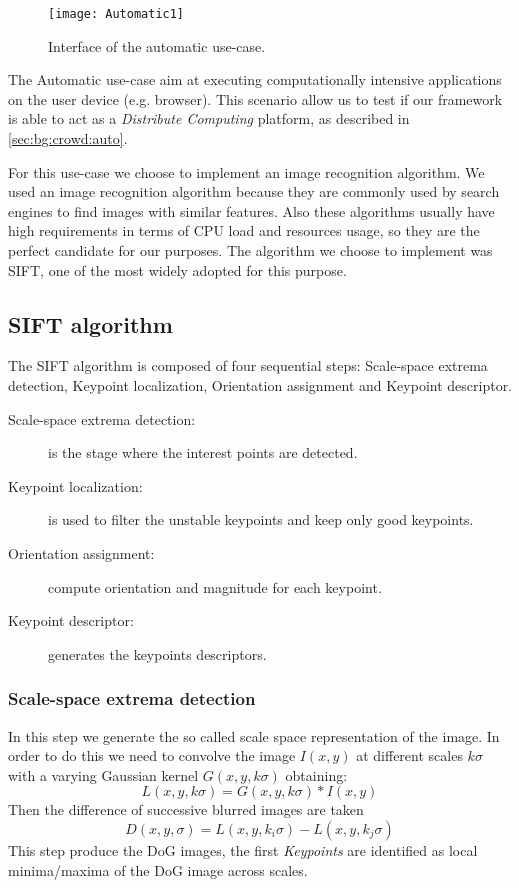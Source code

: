 \begin{figure}[htb]
    \centering
    \texttt{[image: Automatic1]}
    \caption{Interface of the automatic use-case.}
    \label{fig:Automatic1}
\end{figure}

The Automatic use-case aim at executing computationally intensive applications
on the user device (e.g. browser). This scenario allow us to test if our
framework is able to act as a \emph{Distribute Computing} platform, as described
in \ref{sec:bg:crowd:auto}.


For this use-case we choose to implement an image recognition algorithm.
We used an image recognition algorithm because they are commonly used
by search engines to find images with similar features. Also these algorithms
usually have high requirements in terms of CPU load and resources usage, so they
are the perfect candidate for our purposes. The algorithm we choose to implement
was \ac{SIFT}, one of the most widely adopted for this purpose.


\subsection{\acs{SIFT} algorithm}\label{case:auto:sift}
The \ac{SIFT} algorithm is composed of four sequential steps: Scale-space extrema
detection, Keypoint localization, Orientation assignment and Keypoint descriptor.
\begin{description}
    \item[Scale-space extrema detection:] is the stage where the interest points 
    are detected.
    \item[Keypoint localization:] is used to filter the unstable keypoints and
    keep only good keypoints.
    \item[Orientation assignment:] compute orientation and magnitude for
    each keypoint.
    \item[Keypoint descriptor:] generates the keypoints descriptors.
\end{description}

\subsubsection{Scale-space extrema detection}
In this step we generate the so called scale space representation of the image.
In order to do this we need to convolve the image $I(x,y)$ at different scales
$k\sigma$ with a varying Gaussian kernel $G(x,y,k\sigma)$ obtaining:
\[
    L(x,y,k\sigma) = G(x,y,k\sigma) \ast I(x,y)
\]
Then the difference of successive blurred images are taken
\[
    D(x,y,\sigma) = L(x,y,k_i\sigma) - L(x,y,k_j\sigma)
\]
This step produce the \ac{DoG} images, the first \emph{Keypoints} are identified
as local minima/maxima of the \ac{DoG} image across scales.



